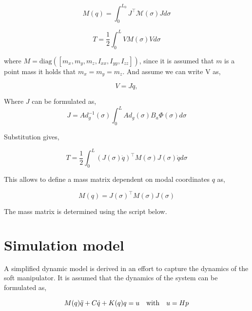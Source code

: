 \begin{equation}
    M(q) = \int_0^{L_0} J^\top \mathcal{M}(\sigma) J d \sigma
\end{equation}

\begin{equation}
    T = \frac{1}{2} \int_0^L VM(\sigma)V d\sigma
\end{equation}

where $M = \text{diag}([m_x,m_y,m_z,I_{xx},I_{yy},I_{zz}])$, since it is assumed that $m$ is a point mass it holds that $m_x=m_y=m_z$. And assume we can write V as,

\begin{equation}
    V = J\dot{q},
\end{equation}

Where $J$ can be formulated as,
\begin{equation}
    J = Ad_g^{-1}(\sigma) \int_0^L Ad_g(\sigma) B_a\Phi(\sigma)d\sigma
\end{equation}

Substitution gives,

\begin{equation}
    T = \frac{1}{2}\int_0^L (J(\sigma)\dot{q})^\top M(\sigma) J(\sigma)\dot{q} d\sigma
\end{equation}

This allows to define a mass matrix dependent on modal coordinates $q$ as,

\begin{equation}
    M(q) = J(\sigma)^\top M(\sigma) J(\sigma) 
\end{equation}

The mass matrix is determined using the script below.









\section{Simulation model}

A simplified dynamic model is derived in an effort to capture the dynamics of the soft manipulator. It is assumed that the dynamics of the system can be formulated as, 

\begin{equation}
    M(q)\Ddot{q} + C\dot{q} + K(q)q = u \hspace{10pt} \text{with} \hspace{10pt} u = Hp
\end{equation}

